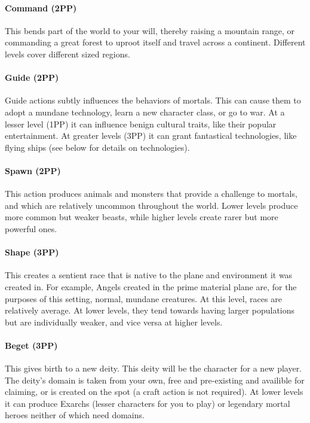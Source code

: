 \documentclass[10pt,a4paper]{article}
\begin{document}
\paragraph*{Command (2PP)}  This bends part of the world to your will, thereby raising a mountain range, or commanding a great forest to uproot itself and travel across a continent. Different levels cover different sized regions.

\paragraph*{Guide (2PP)}  Guide actions subtly influences the behaviors of mortals. This can cause them to adopt a mundane technology, learn a new character class, or go to war. At a lesser level (1PP) it can influence benign cultural traits, like their popular entertainment. At greater levels (3PP) it can grant fantastical technologies, like flying ships (see below for details on technologies).

\paragraph*{Spawn (2PP)}  This action produces animals and monsters that provide a challenge to mortals, and which are relatively uncommon throughout the world. Lower levels produce more common but weaker beasts, while higher levels create rarer but more powerful ones.

\paragraph*{Shape (3PP)}  This creates a sentient race that is native to the plane and environment it was created in. For example, Angels created in the prime material plane are, for the purposes of this setting, normal, mundane creatures. At this level, races are relatively average. At lower levels, they tend towards having larger populations but are individually weaker, and vice versa at higher levels.

\paragraph*{Beget (3PP)}  This gives birth to a new deity. This deity will be the character for a new player. The deity's domain is taken from your own, free and pre-existing and availible for claiming, or is created on the spot (a craft action is not required). At lower levels it can produce Exarchs (lesser characters for you to play) or legendary mortal heroes neither of which need domains.
\end{document}
